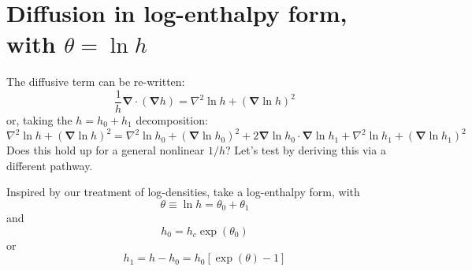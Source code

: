 \documentclass{aastex631}
\newcommand{\del}{\nabla}
\renewcommand{\vec}{\boldsymbol}
\newcommand{\grad}{\vec{\del}}
\begin{document}
\newpage
\appendix
\section{Diffusion in log-enthalpy form, with $\theta = \ln h$}
\label{sec:log enthalpy diffusion}
The diffusive term can be re-written:
\begin{equation}
  \frac{1}{h}\grad\cdot(\grad h) = \nabla^2 \ln h + (\grad \ln h)^2
\end{equation}
or, taking the $h = h_0 + h_1$ decomposition:
\begin{equation}
  \nabla^2 \ln h + (\grad \ln h)^2 = \nabla^2 \ln h_0 + (\grad \ln h_0)^2 + 2\grad \ln h_0 \cdot \grad \ln h_1 + \nabla^2 \ln h_1 + (\grad \ln h_1)^2
\end{equation}
Does this hold up for a general nonlinear $1/h$?  Let's test by deriving this via a different pathway.

Inspired by our treatment of log-densities, take a log-enthalpy form, with
\begin{equation}
  \theta \equiv \ln h = \theta_0 + \theta_1
\end{equation}
and
\begin{equation}
  h_0 = h_c \exp(\theta_0)
\end{equation}
or
\begin{equation}
  h_1 = h-h_0 = h_0 \left[\exp(\theta) - 1\right]
\end{equation}
\end{document}
